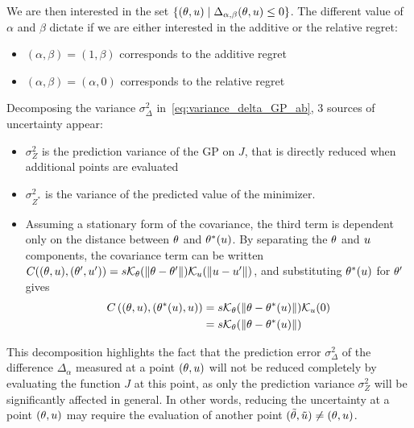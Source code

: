 \documentclass[../../Main_ManuscritThese.tex]{subfiles}
\begin{document}
We are then interested in the set $\{(\theta, u) \mid \Delta_{\alpha, \beta}(\theta, u) \leq 0\}$. The different value of $\alpha$ and $\beta$ dictate if we are either interested in the additive or the relative regret:
\begin{itemize}
\item $(\alpha, \beta) = (1, \beta)$ corresponds to the additive regret
\item $(\alpha, \beta) = (\alpha, 0)$ corresponds to the relative regret
\end{itemize}



Decomposing the variance $\sigma^2_{\Delta}$ in~\cref{eq:variance_delta_GP_ab}, 3 sources of uncertainty appear:
\begin{itemize}
\item $\sigma^2_{Z}$ is the prediction variance of the GP on $J$, that is directly reduced when additional points are evaluated
\item $\sigma^2_{Z^*}$ is the variance of the predicted value of the minimizer.
\item Assuming a stationary form of the covariance, the third term is dependent only on the distance between $\theta$ and $\theta^*(u)$. By separating the $\theta$ and $u$ components, the covariance term can be written $C((\theta,u), (\theta^{\prime},u^{\prime})) = s \mathcal{K}_{\theta}(\|\theta - \theta^{\prime}\|) \mathcal{K}_{u}(\|u - u^{\prime}\|)$, and
  substituting $\theta^*(u)$ for $\theta^{\prime}$ gives
\begin{align}
  C\left((\theta,u),(\theta^*(u),u)\right) &= s  \mathcal{K}_{\theta}(\|\theta - \theta^*(u)\|) \mathcal{K}_{u}(0) \\
                                           &= s  \mathcal{K}_{\theta}(\|\theta - \theta^*(u)\|)
\end{align}
\end{itemize}
This decomposition highlights the fact that the prediction error $\sigma_{\Delta}^2$ of the difference $\Delta_{\alpha}$ measured at a point $(\theta, u)$ will not be reduced completely by evaluating the function $J$ at this point, as only the prediction variance $\sigma_Z^2$ will be significantly affected in general. In other words, reducing the uncertainty at a point $(\theta, u)$ may require the evaluation of another point $(\tilde{\theta},\tilde{u}) \neq (\theta, u)$.
\end{document}
